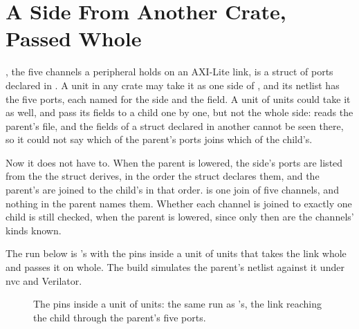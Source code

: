 \section{A Side From Another Crate, Passed Whole}
\label{sec:x-side}

, the five channels a peripheral holds on an AXI-Lite
link, is a struct of ports declared in . A unit in
any crate may take it as one side of , and its netlist has
the five ports, each named for the side and the field. A unit of
units could take it as well, and pass its fields to a child one by
one, but not the whole side: \code{\#[lower]} reads the parent's file,
and the fields of a struct declared in another cannot be seen there,
so it could not say which of the parent's ports joins which of the
child's.

Now it does not have to. When the parent is lowered, the side's ports
are listed from the  the struct derives, in the order the
struct declares them, and the parent's are joined to the child's in
that order.  is one join of five
channels, and nothing in the parent names them. Whether each channel
is joined to exactly one child is still checked, when the parent is
lowered, since only then are the channels' kinds known.

The run below is 's with the pins inside a unit of
units that takes the link whole and passes it on whole. The build
simulates the parent's netlist against it under nvc and Verilator.

\begin{figure}[htbp]
\centering

\caption{The pins inside a unit of units: the same run as
's, the link reaching the child through the parent's
five ports.}
\label{fig:x-side}
\end{figure}




